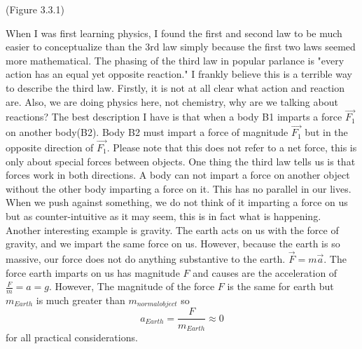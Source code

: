 \begin{center}
(Figure 3.3.1)
\end{center}

When I was first learning physics, I found the first and second law to be much easier to conceptualize than the 3rd law simply because the first two laws seemed more mathematical. The phasing of the third law in popular parlance is "every action has an equal yet opposite reaction." I frankly believe this is a terrible way to describe the third law. Firstly, it is not at all clear what action and reaction are. Also, we are doing physics here, not chemistry, why are we talking about reactions? The best description I have is that when a body B1 imparts a force  $\vec{F_1}$ on another body(B2). Body B2 must impart a force of magnitude $\vec{F_1}$ but in the opposite direction of $\vec{F_1}$. Please note that this does not refer to a net force, this is only about special forces between objects. One thing the third law tells us is that forces work in both directions. A body can not impart a force on another object without the other body imparting a force on it. This has no parallel in our lives. When we push against something, we do not think of it imparting a force on us but as counter-intuitive as it may seem, this is in fact what is happening. Another interesting example is gravity. The earth acts on us with the force of gravity, and we impart the same force on us. However, because the earth is so massive, our force does not do anything substantive to the earth. $\vec{F} =m\vec{a}$. The force earth imparts on us has magnitude $F$ and causes are the acceleration of $\frac{F}{m}=a=g$. However, The magnitude of the force $F$ is the same for earth but $m_{Earth}$ is much greater than $m_{normal object}$ so $$a_{Earth}=\frac{F}{m_{Earth}}\approx0$$ for all practical considerations.